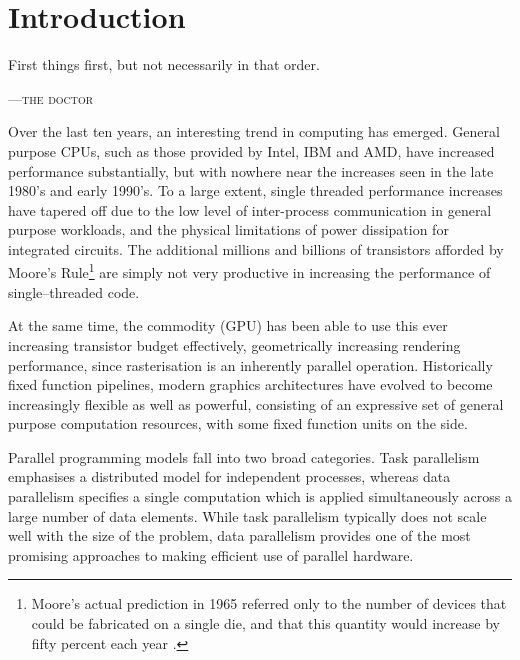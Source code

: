 
\chapter{Introduction}
\epigraph{First things first, but not necessarily in that order.}
{\textsc{---the doctor}}



Over the last ten years, an interesting trend in computing has emerged. General
purpose CPUs, such as those provided by Intel, IBM and AMD, have increased
performance substantially, but with nowhere near the increases seen in the late
1980's and early 1990's. To a large extent, single threaded performance
increases have tapered off due to the low level of inter-process communication
in general purpose workloads, and the physical limitations of power dissipation
for integrated circuits. The additional millions and billions of transistors
afforded by Moore's Rule\footnote{Moore's actual prediction in 1965 referred
only to the number of devices that could be fabricated on a single die, and that
this quantity would increase by fifty percent each year \cite{Moore:1965wc}.}
are simply not very productive in increasing the performance of single--threaded
code.

At the same time, the commodity  (GPU) has been
able to use this ever increasing transistor budget effectively, geometrically
increasing rendering performance, since rasterisation is an inherently parallel
operation. Historically fixed function pipelines, modern graphics architectures
have evolved to become increasingly flexible as well as powerful, consisting of
an expressive set of general purpose computation resources, with some fixed
function units on the side.

Parallel programming models fall into two broad categories. Task parallelism
emphasises a distributed model for independent processes, whereas data
parallelism specifies a single computation which is applied simultaneously
across a large number of data elements. While task parallelism typically does not
scale well with the size of the problem, data parallelism provides one of the
most promising approaches to making efficient use of parallel hardware.

